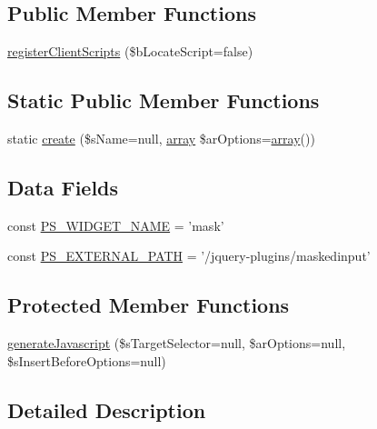 \subsection*{Public Member Functions}
\begin{DoxyCompactItemize}
\item 
\hyperlink{classCPSjqMaskedInputWrapper_ac02a66bde8e72e4909137bf748edf665}{registerClientScripts} (\$bLocateScript=false)
\end{DoxyCompactItemize}
\subsection*{Static Public Member Functions}
\begin{DoxyCompactItemize}
\item 
static \hyperlink{classCPSjqMaskedInputWrapper_a0ffc269a208148ade57c7eb608a4562a}{create} (\$sName=null, \hyperlink{list_8php_aa3205d038c7f8feb5c9f01ac4dfadc88}{array} \$arOptions=\hyperlink{list_8php_aa3205d038c7f8feb5c9f01ac4dfadc88}{array}())
\end{DoxyCompactItemize}
\subsection*{Data Fields}
\begin{DoxyCompactItemize}
\item 
const \hyperlink{classCPSjqMaskedInputWrapper_ae357f9dc377f7de0d12010b2ced28cbc}{PS\_\-WIDGET\_\-NAME} = 'mask'
\item 
const \hyperlink{classCPSjqMaskedInputWrapper_a8ccb5e1d65c091f944a6aa8c5be834ca}{PS\_\-EXTERNAL\_\-PATH} = '/jquery-\/plugins/maskedinput'
\end{DoxyCompactItemize}
\subsection*{Protected Member Functions}
\begin{DoxyCompactItemize}
\item 
\hyperlink{classCPSjqMaskedInputWrapper_a273c0dc58b59db25cfd5a37561bccec5}{generateJavascript} (\$sTargetSelector=null, \$arOptions=null, \$sInsertBeforeOptions=null)
\end{DoxyCompactItemize}


\subsection{Detailed Description}


